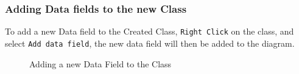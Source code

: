 \documentclass[a4paper]{article}
\begin{document}
\subsubsection{Adding Data fields to the new Class}
To add a new Data field to the Created Class, \texttt{Right Click} on the class, and select \texttt{Add data field}, the new data field will then be added to the diagram.
\begin{figure}[H]
\begin{center}
 \imagespace
{}
\caption{Adding a new Data Field to the Class}
\end{center}
\end{figure}
\end{document}
